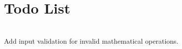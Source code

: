 \chapter{Todo List }
\hypertarget{todo}{}\label{todo}

\begin{DoxyRefList}
\item[{\parbox[t]{\linewidth}{Class \doxylink{class_calculation_engine}{Calculation\+Engine} }}]\hfill \\
\label{todo__todo000001}%
%
Add input validation for invalid mathematical operations. 
\end{DoxyRefList}